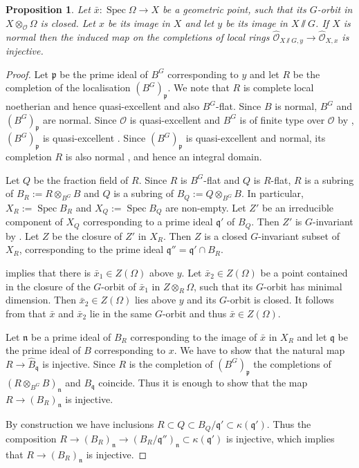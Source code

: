 \documentclass{amsart}
\newtheorem{prop}{Proposition}[section]
\theoremstyle{definition}
\theoremstyle{remark}
\DeclareMathOperator{\Spec}{Spec}
\newcommand{\OO}{\mathcal O}
\newcommand{\nn}{\mathfrak n}
\newcommand{\pp}{\mathfrak p}
\newcommand{\qq}{\mathfrak{q}}
\newcommand{\xbar}{\bar{x}}
\renewcommand{\xbar}{\bar{x}}
\begin{document}
\begin{prop}\label{compl_inj} Let $\xbar: \Spec \Omega \rightarrow X$ be a geometric point, such that 
its $G$-orbit in $X\otimes_{\OO}\Omega$ is closed. Let $x$ be its image in $X$ and 
let $y$ be its image in $X\sslash G$. If $X$ is normal then the induced map 
on the completions of local rings $\widehat{\OO}_{X\sslash G, y} \rightarrow 
\widehat{\OO}_{X,x}$ is injective. 
\end{prop}

\begin{proof} Let $\pp$ be the prime ideal of $B^G$ corresponding to $y$ and let $R$ 
be the completion of the localisation $(B^G)_{\pp}$. 
We note that $R$ is  complete local noetherian and hence quasi-excellent and also $B^G$-flat. 
Since $B$ is normal, $B^G$ and $(B^G)_{\pp}$ are normal. Since $\OO$ is quasi-excellent and $B^G$ is of finite type over $\OO$ by \cite[Theorem 2]{seshadri}, $(B^G)_{\pp}$ is quasi-excellent \cite[\href{https://stacks.math.columbia.edu/tag/07QU}{Tag 07QU}]{stacks-project}. Since $(B^G)_{\pp}$ 
is quasi-excellent and normal, its completion $R$ is also normal \cite[\href{https://stacks.math.columbia.edu/tag/0C23}{Tag 0C23}]{stacks-project}, and hence an integral domain.

Let $Q$ be the fraction field of $R$. 
Since $R$ is $B^G$-flat and $Q$ is $R$-flat, $R$ is a subring of $B_R:=R\otimes_{B^G} B$ and $Q$  is a subring of $B_{Q}:=Q\otimes_{B^G} B$. In particular, $X_R:=\Spec B_R$ and $X_Q:=\Spec B_Q$ 
are non-empty. 
Let $Z'$ be an irreducible 
component of $X_Q$
corresponding to a prime ideal $\qq'$ of 
$B_Q$. Then $Z'$ is $G$-invariant by \cite[Lemma 2.1]{BIP_new}. 
Let $Z$ be the closure of $Z'$ in $X_R$. Then $Z$ is a closed  $G$-invariant
subset of $X_R$,  corresponding to the prime ideal $\qq''= \qq'\cap B_R$. 


 implies that there is $\xbar_1\in Z(\Omega)$ above $y$. Let 
$\xbar_2\in Z(\Omega)$ 
be a point  contained in the closure of the $G$-orbit 
of $\xbar_1$ in $Z\otimes_R \Omega$, such that its $G$-orbit has minimal dimension. Then $\xbar_2\in Z(\Omega)$ lies above $y$ and its $G$-orbit is closed. It follows from \cite[Theorem 3 (ii)]{seshadri} that $\xbar$ and $\xbar_2$ lie in the same $G$-orbit and thus $\xbar\in Z(\Omega)$. 

 Let $\nn$ be a prime ideal of $B_R$ corresponding to the image of $\xbar$ in $X_R$ and  let $\qq$ be the prime ideal of $B$ corresponding to $x$. We have to show that the natural map $R\rightarrow \widehat{B}_{\qq}$ is injective. 
 Since $R$ is the completion of $(B^G)_{\pp}$ the 
completions of $(R\otimes_{B^G} B)_{\nn}$ and 
 $B_{\qq}$ coincide. Thus it is enough to 
show that the map $R\rightarrow ( B_R)_{\nn}$ is injective. 

By construction we have inclusions $R\subset Q\subset B_Q/\qq'\subset \kappa(\qq')$. Thus the composition $R\rightarrow ( B_R)_{\nn}\rightarrow (B_R/\qq'')_{\nn} \subset \kappa(\qq')$ is injective, which implies that $R\rightarrow (B_R)_{\nn}$ is injective. 
\end{proof}
\end{document}

